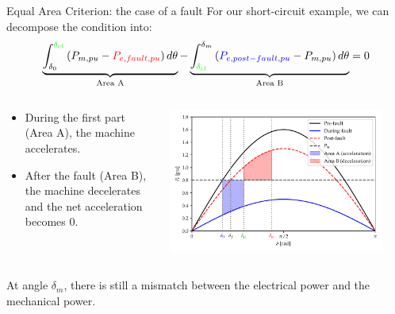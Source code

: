 \begin{frame}[allowframebreaks]{Equal Area Criterion: the case of a fault}
For our short-circuit example, we can decompose the condition into:
$$\underbrace{\int_{\delta_0}^{\mathcolor{green}{\delta_{cl}}} \left(P_{m,pu}-\mathcolor{red}{P_{e,fault,pu}}\right) d\theta}_{\text{Area A}} - \underbrace{\int_{\mathcolor{green}{\delta_{cl}}}^{\delta_{m}} \left(\mathcolor{blue}{P_{e,post-fault,pu}}-P_{m,pu}\right) d\theta}_{\text{Area B}} = 0$$
\begin{columns}
    \begin{column}{0.55\textwidth}
        \begin{itemize}
            \item During the first part (Area A), the machine accelerates. 
            \item After the fault (Area B), the machine decelerates and the net acceleration becomes 0. 
        \end{itemize}
    \end{column}
    \begin{column}{0.45\textwidth}
        \begin{center}
        \includegraphics[width=0.9\textwidth]{images/EAC.pdf}
        \end{center}
    \end{column}
\end{columns}

\begin{columns}
    \begin{column}{0.5\textwidth}
        At angle $\delta_{m}$, there is still a mismatch between the electrical power and the mechanical power. 
        

\end{column}
\end{columns}
\end{frame}
